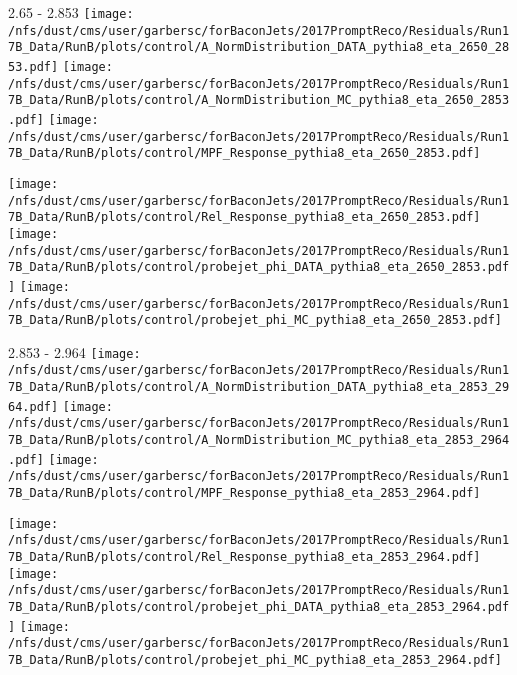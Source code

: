 \documentclass[t,compress]{beamer}
\begin{document}
\begin{frame}{2.65 - 2.853}
	\texttt{[image: /nfs/dust/cms/user/garbersc/forBaconJets/2017PromptReco/Residuals/Run17B\_Data/RunB/plots/control/A\_NormDistribution\_DATA\_pythia8\_eta\_2650\_2853.pdf]}
	\texttt{[image: /nfs/dust/cms/user/garbersc/forBaconJets/2017PromptReco/Residuals/Run17B\_Data/RunB/plots/control/A\_NormDistribution\_MC\_pythia8\_eta\_2650\_2853.pdf]}
	\texttt{[image: /nfs/dust/cms/user/garbersc/forBaconJets/2017PromptReco/Residuals/Run17B\_Data/RunB/plots/control/MPF\_Response\_pythia8\_eta\_2650\_2853.pdf]}
\newline

	\texttt{[image: /nfs/dust/cms/user/garbersc/forBaconJets/2017PromptReco/Residuals/Run17B\_Data/RunB/plots/control/Rel\_Response\_pythia8\_eta\_2650\_2853.pdf]}
	\texttt{[image: /nfs/dust/cms/user/garbersc/forBaconJets/2017PromptReco/Residuals/Run17B\_Data/RunB/plots/control/probejet\_phi\_DATA\_pythia8\_eta\_2650\_2853.pdf]}
	\texttt{[image: /nfs/dust/cms/user/garbersc/forBaconJets/2017PromptReco/Residuals/Run17B\_Data/RunB/plots/control/probejet\_phi\_MC\_pythia8\_eta\_2650\_2853.pdf]}
\end{frame}

\begin{frame}{2.853 - 2.964}
	\texttt{[image: /nfs/dust/cms/user/garbersc/forBaconJets/2017PromptReco/Residuals/Run17B\_Data/RunB/plots/control/A\_NormDistribution\_DATA\_pythia8\_eta\_2853\_2964.pdf]}
	\texttt{[image: /nfs/dust/cms/user/garbersc/forBaconJets/2017PromptReco/Residuals/Run17B\_Data/RunB/plots/control/A\_NormDistribution\_MC\_pythia8\_eta\_2853\_2964.pdf]}
	\texttt{[image: /nfs/dust/cms/user/garbersc/forBaconJets/2017PromptReco/Residuals/Run17B\_Data/RunB/plots/control/MPF\_Response\_pythia8\_eta\_2853\_2964.pdf]}
\newline

	\texttt{[image: /nfs/dust/cms/user/garbersc/forBaconJets/2017PromptReco/Residuals/Run17B\_Data/RunB/plots/control/Rel\_Response\_pythia8\_eta\_2853\_2964.pdf]}
	\texttt{[image: /nfs/dust/cms/user/garbersc/forBaconJets/2017PromptReco/Residuals/Run17B\_Data/RunB/plots/control/probejet\_phi\_DATA\_pythia8\_eta\_2853\_2964.pdf]}
	\texttt{[image: /nfs/dust/cms/user/garbersc/forBaconJets/2017PromptReco/Residuals/Run17B\_Data/RunB/plots/control/probejet\_phi\_MC\_pythia8\_eta\_2853\_2964.pdf]}
\end{frame}
\end{document}
